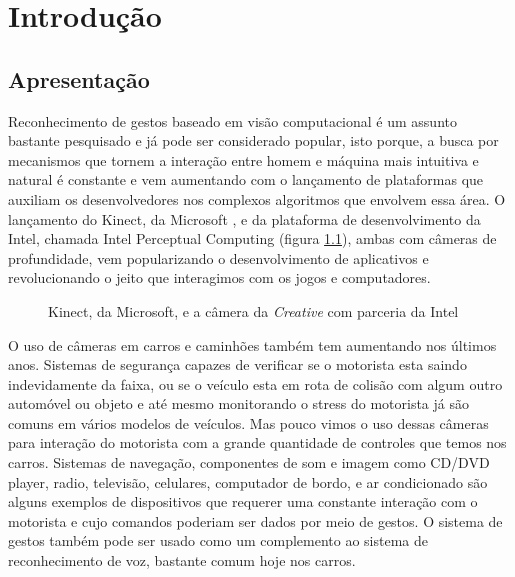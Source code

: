 \chapter{Introdução}

\section{Apresentação}

Reconhecimento de gestos baseado em visão computacional é um assunto bastante pesquisado e já pode ser considerado popular, isto porque, a busca por mecanismos que tornem a interação entre homem e máquina mais intuitiva e natural é constante e vem aumentando com o lançamento de plataformas que auxiliam os desenvolvedores nos complexos algoritmos que envolvem essa área.
O lançamento do Kinect, da Microsoft \cite{kinect}, e da plataforma de desenvolvimento da Intel, chamada Intel Perceptual Computing \cite{intel} (figura \ref{fig:depth_camera}),  ambas com câmeras de profundidade, vem popularizando o desenvolvimento de aplicativos e revolucionando o jeito que interagimos com os jogos e computadores. 

\begin{figure}[ht!]
\centering
{}
  \caption{Kinect, da Microsoft, e a câmera da \textit{Creative} com parceria da Intel}
  \label{fig:depth_camera}
\end{figure}

O uso de câmeras em carros e caminhões também tem aumentando nos últimos anos. Sistemas de segurança capazes de verificar se o motorista esta saindo indevidamente da faixa, ou se o veículo esta em rota de colisão com algum outro automóvel ou objeto e até mesmo monitorando o stress do motorista já são comuns em vários modelos de veículos. Mas pouco vimos o uso dessas câmeras para interação do motorista com a grande quantidade de controles que temos nos carros. Sistemas de navegação, componentes de som e imagem como CD/DVD player, radio, televisão, celulares, computador de bordo, e ar condicionado são alguns exemplos de dispositivos que requerer uma constante interação com o motorista e cujo comandos poderiam ser dados por meio de gestos.
O sistema de gestos também pode ser usado como um complemento ao sistema de reconhecimento de voz, bastante comum hoje nos carros.

